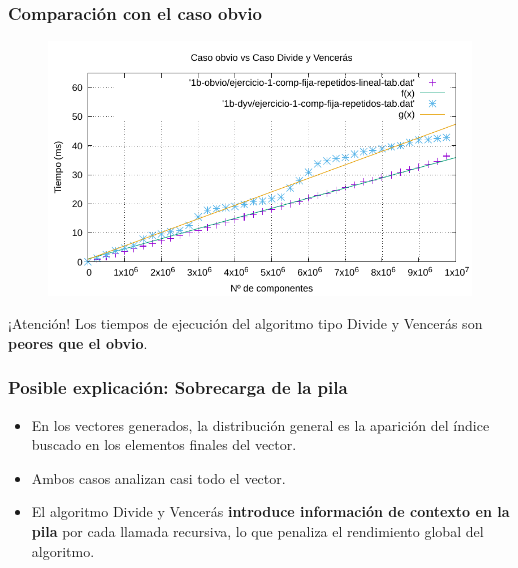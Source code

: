 \documentclass[13pt]{beamer}
\begin{document}
    \begin{frame}
        \frametitle{Comparación con el caso obvio}

        \begin{figure}
            \centering
            \includegraphics[scale=0.66]{img/e1b-comp.pdf}
            \label{fig:1b-comp}
        \end{figure}

        \begin{alertblock}{¡Atención!}
            Los tiempos de ejecución del algoritmo tipo Divide y Vencerás son \textbf{peores que el obvio}. 
        \end{alertblock}
    \end{frame}

    \begin{frame}
        \frametitle{Posible explicación: Sobrecarga de la pila}
        \begin{itemize}
            \item En los vectores generados, la distribución 
            general es la aparición del índice
            buscado en los elementos finales del vector.
            \item Ambos casos analizan casi todo el vector.
            \item El algoritmo Divide y Vencerás \textbf{introduce información de contexto
            en la pila} por cada llamada recursiva, lo que penaliza el rendimiento global del
            algoritmo. 
        \end{itemize}
    \end{frame}

\end{document}
